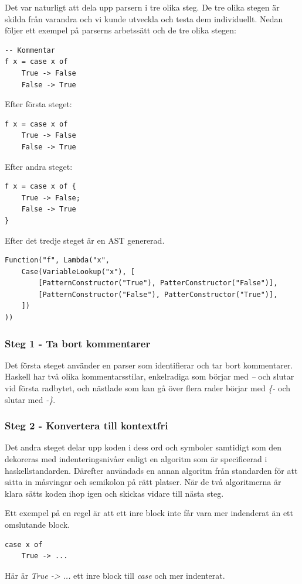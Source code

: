 Det var naturligt att dela upp parsern i tre olika steg. De tre olika stegen är skilda från varandra och vi kunde utveckla och testa dem individuellt.
Nedan följer ett exempel på parserns arbetssätt och de tre olika stegen:
\begin{lstlisting}
-- Kommentar
f x = case x of
    True -> False
    False -> True
\end{lstlisting}

Efter första steget:
\begin{lstlisting}
f x = case x of
    True -> False
    False -> True
\end{lstlisting}

Efter andra steget:
\begin{lstlisting}
f x = case x of {
    True -> False;
    False -> True
}
\end{lstlisting}

Efter det tredje steget är en AST genererad.
\begin{lstlisting}
Function("f", Lambda("x", 
    Case(VariableLookup("x"), [
        [PatternConstructor("True"), PatterConstructor("False")],
        [PatternConstructor("False"), PatterConstructor("True")],
    ])
))
\end{lstlisting}

\subsubsection{Steg 1 - Ta bort kommentarer}
Det första steget använder en parser som identifierar och tar bort kommentarer. 
Haskell har två olika kommentarsstilar, enkelradiga som börjar med \emph{--} och slutar vid första radbytet, och 
nästlade som kan gå över flera rader börjar med \emph{\{-} och slutar med \emph{-\}}.

\subsubsection{Steg 2 - Konvertera till kontextfri}
Det andra steget delar upp koden i dess ord och symboler samtidigt som den dekoreras med indenteringsnivåer enligt en algoritm %
som är specificerad i haskellstandarden. Därefter användads en annan algoritm från standarden för att sätta in måsvingar och semikolon på rätt platser. %
När de två algoritmerna är klara sätts koden ihop igen och skickas vidare till nästa steg.

Ett exempel på en regel är att ett inre block inte får vara mer indenderat än ett omslutande block.
\begin{lstlisting}
case x of
    True -> ...
\end{lstlisting}
Här är \emph{True -> ...} ett inre block till \emph{case} och mer indenterat.

